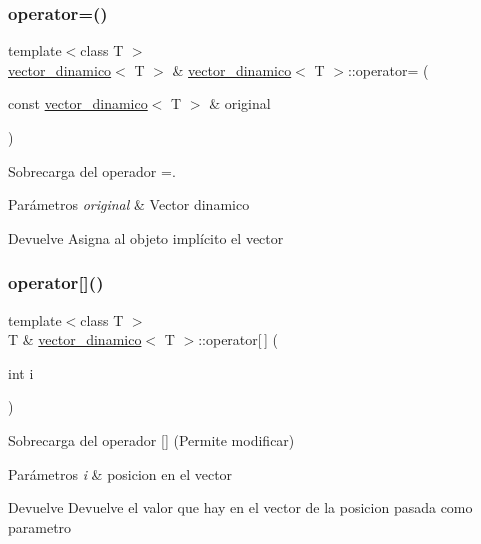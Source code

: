 \subsubsection{\texorpdfstring{operator=()}{operator=()}}
{\footnotesize\ttfamily template$<$class T $>$ \\
\hyperlink{classvector__dinamico}{vector\+\_\+dinamico}$<$ T $>$ \& \hyperlink{classvector__dinamico}{vector\+\_\+dinamico}$<$ T $>$\+::operator= (\begin{DoxyParamCaption}\item[{const \hyperlink{classvector__dinamico}{vector\+\_\+dinamico}$<$ T $>$ \&}]{original }\end{DoxyParamCaption})}



Sobrecarga del operador =. 


\begin{DoxyParams}{Parámetros}
{\em original} & Vector dinamico \\
\hline
\end{DoxyParams}
\begin{DoxyReturn}{Devuelve}
Asigna al objeto implícito el vector 
\end{DoxyReturn}
\mbox{\label{classvector__dinamico_a8ad7523a8d94986322dc71d0913c8535}} 
\subsubsection{\texorpdfstring{operator[]()}{operator[]()}\hspace{0.1cm}{\footnotesize\ttfamily [1/2]}}
{\footnotesize\ttfamily template$<$class T $>$ \\
T \& \hyperlink{classvector__dinamico}{vector\+\_\+dinamico}$<$ T $>$\+::operator\mbox{[}$\,$\mbox{]} (\begin{DoxyParamCaption}\item[{int}]{i }\end{DoxyParamCaption})}



Sobrecarga del operador \mbox{[}\mbox{]} (Permite modificar) 


\begin{DoxyParams}{Parámetros}
{\em i} & posicion en el vector \\
\hline
\end{DoxyParams}
\begin{DoxyReturn}{Devuelve}
Devuelve el valor que hay en el vector de la posicion pasada como parametro 
\end{DoxyReturn}
\mbox{\label{classvector__dinamico_a7e3f09d91df9c6008525f8d8737f743c}} 
